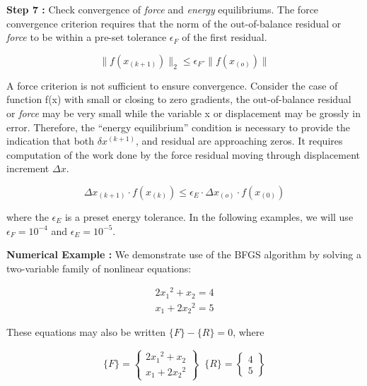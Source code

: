 \vspace{0.15 in}\noindent
{\bf Step 7 :}
Check convergence of {\em force} and {\em energy} equilibriums.
The force convergence criterion requires that the norm of the
out-of-balance residual or {\em force} to be within a pre-set tolerance 
$ \epsilon_F $ of the first residual.

\begin{equation}
\| f(x_{(k+1)}) \|_2 \leq \epsilon_F \cdot \| f(x_{(o)}) \|
\label{eq: BFGS-8}
\end{equation}

\vspace{0.15 in}\noindent
A force criterion is not sufficient to ensure convergence.
Consider the case of function f(x) with small or closing to zero gradients,
the out-of-balance residual or {\em force} may be very small
while the variable x or displacement may be grossly in error.
Therefore, the ``energy equilibrium'' condition is necessary to
provide the indication that both $\delta x^{(k+1)}$, and residual
are approaching zeros.  It requires computation of the work done
by the force residual moving through displacement increment $ \Delta x $.  

\begin{equation}
\Delta x_{(k+1)} \cdot f(x_{(k)}) \leq \epsilon_E \cdot \Delta x_{(o)} \cdot f(x_{(0)})
\label{eq: BFGS-9}
\end{equation}

\noindent
where the $\epsilon_E $ is a preset energy tolerance.
In the following examples, we will use $ \epsilon_F = 10^{-4} $ and $ \epsilon_E = 10^{-5}$.

\vspace{0.15 in}\noindent
{\bf Numerical Example :}
We demonstrate use of the BFGS algorithm by solving a two-variable
family of nonlinear equations:

\begin{equation}
\begin{array}{c}
 2{x_1}^2 +   x_2    = 4\\
  {x_1}   + 2{x_2}^2 = 5
\end{array}
\end{equation}

\vspace{0.15 in}\noindent
These equations may also be written $\{F\} - \{R\} = 0$, where

\begin{equation}
\{F\} = \left \{ \begin{array}{c}
                  2{x_1}^2 +   x_2  \\
                   {x_1}   + 2{x_2}^2
                 \end{array} \right \} \;\; \{R\} = \left \{ \begin{array}{c}
                                                           4  \\
                                                           5
                                                         \end{array} \right \}
\end{equation}

